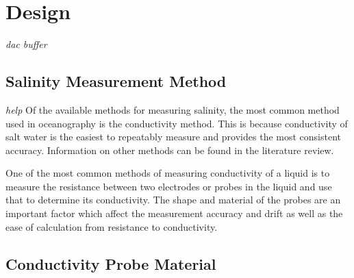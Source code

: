 
\chapter{Design}\label{ch:design}

\textit{dac buffer}

\section{Salinity Measurement Method}

\textit{help}
Of the available methods for measuring salinity, the most common method used in oceanography is the conductivity method.
This is because conductivity of salt water is the easiest to repeatably measure and provides the most consistent accuracy.
Information on other methods can be found in the literature review.

One of the most common methods of measuring conductivity of a liquid is to measure the resistance between two electrodes or probes in the liquid and use that to determine its conductivity.
The shape and material of the probes are an important factor which affect the measurement accuracy and drift as well as the ease of calculation from resistance to conductivity.

\section{Conductivity Probe Material}

